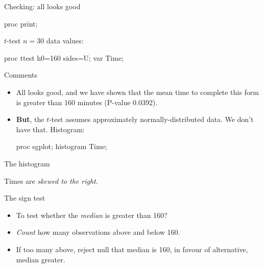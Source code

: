 \documentclass[unknownkeysallowed]{beamer}\usepackage[]{graphicx}\usepackage[]{color}
\begin{document}
\begin{frame}[fragile]{Checking: all looks good}
  
  \begin{Sascode}[store=ij]
proc print;    
  \end{Sascode}
  
  
\end{frame}

\begin{frame}[fragile]{$t$-test}
  $n=30$ data values:
  \begin{Sascode}[store=ik]
proc ttest h0=160 sides=U;
  var Time;
  \end{Sascode}
  
\end{frame}

\begin{frame}[fragile]{Comments}
  
  \begin{itemize}
  \item All looks good, and we have shown that the mean time to
    complete this form is greater than 160 minutes (P-value 0.0392). 
  \item \textbf{But}, the $t$-test assumes approximately
    normally-distributed data. We don't have that. Histogram:
    
    \begin{Sascode}[store=il]
proc sgplot;
  histogram Time;
    \end{Sascode}
  \end{itemize}
  
\end{frame}

\begin{frame}[fragile]{The histogram}
  

Times are \emph{skewed to the right}. 

\end{frame}


\begin{frame}[fragile]{The sign test}
  
  \begin{itemize}
  \item To test whether the \emph{median} is greater than 160?
  \item \emph{Count} how many observations above and below 160.
  \item If too many above, reject null that median is 160, in favour
    of alternative, median greater.
  \end{itemize}
  
\end{frame}
\end{document}
